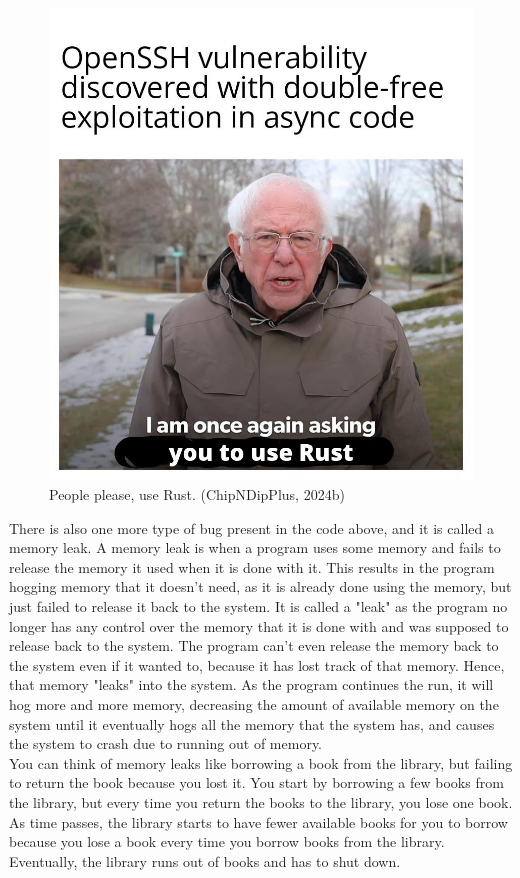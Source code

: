 \documentclass[11pt]{article}
\makeatletter
\newcommand{\citeprocitem}[2]{\hyper@linkstart{cite}{citeproc_bib_item_#1}#2\hyper@linkend}
\makeatother
\begin{document}
\begin{figure}[htbp]
\centering
\includegraphics[width=.9\linewidth]{./images/double-free-bugs.jpeg}
\caption{People please, use Rust. (\citeprocitem{7}{ChipNDipPlus, 2024b})}
\end{figure}

 \newpage

There is also one more type of bug present in the code above,
and it is called a memory leak. A memory leak is when a program
uses some memory and fails to release the memory it used when it
is done with it. This results in the program hogging memory that
it doesn't need, as it is already done using the memory, but just
failed to release it back to the system. It is called a "leak"
as the program no longer has any control over the memory that it
is done with and was supposed to release back to the system.
The program can't even release the memory back to the system
even if it wanted to, because it has lost track of that memory.
Hence, that memory "leaks" into the system. As the program
continues the run, it will hog more and more memory,
decreasing the amount of available memory on the system until
it eventually hogs all the memory that the system has,
and causes the system to crash due to running out of memory.  \\

You can think of memory leaks like borrowing a book from the library,
but failing to return the book because you lost it. You start by
borrowing a few books from the library, but every time you return the
books to the library, you lose one book. As time passes, the library
starts to have fewer available books for you to borrow
because you lose a book every time you borrow books from the library.
Eventually, the library runs out of books and has to shut down.
\end{document}
